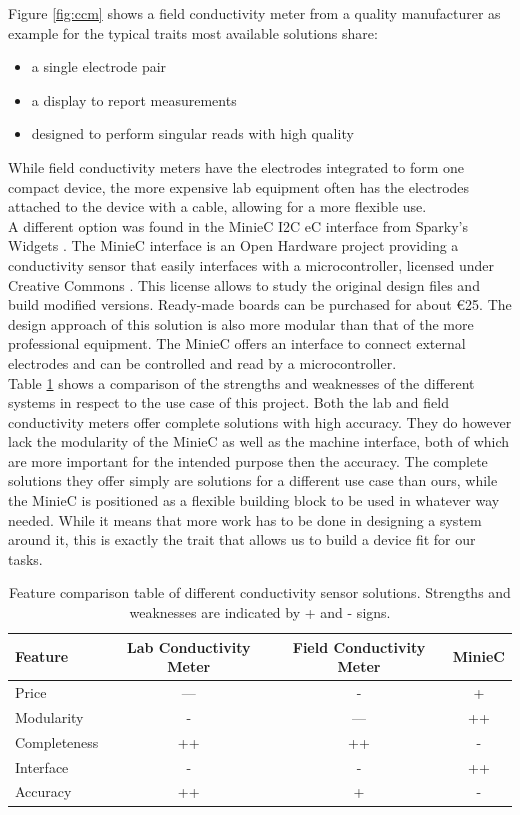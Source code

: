 Figure \ref{fig:ccm} shows a field conductivity meter from a quality manufacturer as example for the typical traits most available solutions share:
\begin{itemize}
	\item a single electrode pair
	\item a display to report measurements
	\item designed to perform singular reads with high quality
\end{itemize}

While field conductivity meters have the electrodes integrated to form one compact device, the more expensive lab equipment often has the electrodes attached to the device with a cable, allowing for a more flexible use.\\

A different option was found in the MinieC I2C eC interface from Sparky's Widgets \parencite{uec}. The MinieC interface is an Open Hardware project providing a conductivity sensor that easily interfaces with a microcontroller, licensed under Creative Commons \parencite{cc}. This license allows to study the original design files and build modified versions. Ready-made boards can be purchased for about \euro{25}. The design approach of this solution is also more modular than that of the more professional equipment. The MinieC offers an interface to connect external electrodes and can be controlled and read by a microcontroller.\\

Table \ref{tab:feat} shows a comparison of the strengths and weaknesses of the different systems in respect to the use case of this project. Both the lab and field conductivity meters offer complete solutions with high accuracy. They do however lack the modularity of the MinieC as well as the machine interface, both of which are more important for the intended purpose then the accuracy. The complete solutions they offer simply are solutions for a different use case than ours, while the MinieC is positioned as a flexible building block to be used in whatever way needed. While it means that more work has to be done in designing a system around it, this is exactly the trait that allows us to build a device fit for our tasks.

\begin{table}[H]
    \centering

    \caption[]{Feature comparison table of different conductivity sensor solutions. Strengths and weaknesses are indicated by + and - signs.}
    \label{tab:feat}
    \begin{tabular}{l  c  c  c}
        	\toprule
         Feature & Lab Conductivity Meter & Field Conductivity Meter & MinieC \\
        	\midrule
		Price & --- & - & + \\
		Modularity & - & --- & ++ \\
		Completeness & ++ & ++ & - \\
		Interface & - & - & ++ \\
		Accuracy & ++ & + & - \\
        \bottomrule
    \end{tabular}
\end{table}